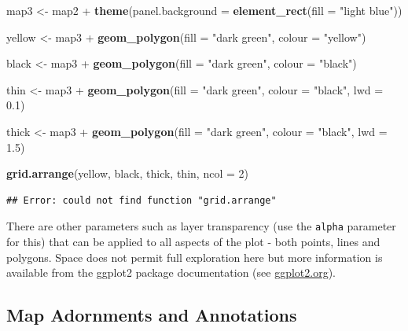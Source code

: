\documentclass[]{article}
\newenvironment{Shaded}{}{}
\newcommand{\KeywordTok}[1]{\textcolor[rgb]{0.00,0.44,0.13}{\textbf{{#1}}}}
\newcommand{\DataTypeTok}[1]{\textcolor[rgb]{0.56,0.13,0.00}{{#1}}}
\newcommand{\DecValTok}[1]{\textcolor[rgb]{0.25,0.63,0.44}{{#1}}}
\newcommand{\FloatTok}[1]{\textcolor[rgb]{0.25,0.63,0.44}{{#1}}}
\newcommand{\StringTok}[1]{\textcolor[rgb]{0.25,0.44,0.63}{{#1}}}
\newcommand{\NormalTok}[1]{{#1}}
\begin{document}
\begin{Shaded}
\begin{Highlighting}[]
\NormalTok{map3 <-}\StringTok{ }\NormalTok{map2 +}\StringTok{ }\KeywordTok{theme}\NormalTok{(}\DataTypeTok{panel.background =} \KeywordTok{element_rect}\NormalTok{(}\DataTypeTok{fill =} \StringTok{"light blue"}\NormalTok{))}

\NormalTok{yellow <-}\StringTok{ }\NormalTok{map3 +}\StringTok{ }\KeywordTok{geom_polygon}\NormalTok{(}\DataTypeTok{fill =} \StringTok{"dark green"}\NormalTok{, }\DataTypeTok{colour =} \StringTok{"yellow"}\NormalTok{)}

\NormalTok{black <-}\StringTok{ }\NormalTok{map3 +}\StringTok{ }\KeywordTok{geom_polygon}\NormalTok{(}\DataTypeTok{fill =} \StringTok{"dark green"}\NormalTok{, }\DataTypeTok{colour =} \StringTok{"black"}\NormalTok{)}

\NormalTok{thin <-}\StringTok{ }\NormalTok{map3 +}\StringTok{ }\KeywordTok{geom_polygon}\NormalTok{(}\DataTypeTok{fill =} \StringTok{"dark green"}\NormalTok{, }\DataTypeTok{colour =} \StringTok{"black"}\NormalTok{, }\DataTypeTok{lwd =} \FloatTok{0.1}\NormalTok{)}

\NormalTok{thick <-}\StringTok{ }\NormalTok{map3 +}\StringTok{ }\KeywordTok{geom_polygon}\NormalTok{(}\DataTypeTok{fill =} \StringTok{"dark green"}\NormalTok{, }\DataTypeTok{colour =} \StringTok{"black"}\NormalTok{, }\DataTypeTok{lwd =} \FloatTok{1.5}\NormalTok{)}

\KeywordTok{grid.arrange}\NormalTok{(yellow, black, thick, thin, }\DataTypeTok{ncol =} \DecValTok{2}\NormalTok{)}
\end{Highlighting}
\end{Shaded}

\begin{verbatim}
## Error: could not find function "grid.arrange"
\end{verbatim}

There are other parameters such as layer transparency (use the
\texttt{alpha} parameter for this) that can be applied to all aspects of
the plot - both points, lines and polygons. Space does not permit full
exploration here but more information is available from the ggplot2
package documentation (see \href{http://ggplot2.org/}{ggplot2.org}).

\subsection{Map Adornments and
Annotations}\label{map-adornments-and-annotations}
\end{document}
